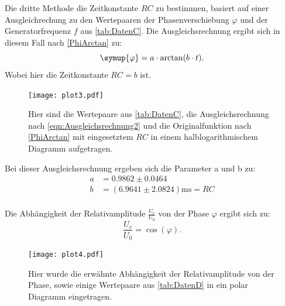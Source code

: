 Die dritte Methode die Zeitkonstante $RC$ zu bestimmen, basiert auf einer Ausgleichrechung zu den Wertepaaren der Phasenverschiebung $\varphi$ 
und der Generatorfrequenz $f$ aus \autoref{tab:DatenC}.
Die Ausgleichsrechnung ergibt sich in diesem Fall nach \eqref{PhiArctan} zu:
\begin{equation}
  \label{eqn:Ausgleichsrechnung2}
  \symup{\varphi} = a\cdot\arctan(b\cdot t).
\end{equation}
Wobei hier die Zeitkonstante $RC = b$ ist.
\begin{figure}
  \centering
  \texttt{[image: plot3.pdf]}
  \caption{Hier sind die Wertepaare aus \autoref{tab:DatenC}, die Ausgleichsrechnung nach \eqref{eqn:Ausgleichsrechnung2} und die Originalfunktion nach \eqref{PhiArctan} mit eingesetztem $RC$ in einem halblogarithmischem Diagramm aufgetragen.}
  \label{fig:plot3}
\end{figure}
Bei dieser Ausgleichsrechnung ergeben sich die Parameter a und b zu:
\begin{align*}
  a &=0.9862\pm 0.0464 \\
  b &=(6.9641\pm 2.0824) \unit{\milli\second} = RC \\
\end{align*}

Die Abhängigkeit der Relativamplitude $\frac{U_c}{U_0}$ von der Phase $\varphi$ ergibt sich zu:
\begin{equation*}
  \frac{U_c}{U_0} = \cos\left(\varphi\right).
\end{equation*}

\begin{figure}
  \centering
  \texttt{[image: plot4.pdf]}
  \caption{Hier wurde die erwähnte Abhängigkeit der Relativamplitude von der Phase, sowie einige Wertepaare aus \autoref{tab:DatenD} in ein polar Diagramm eingetragen.}
  \label{fig:plot4}
\end{figure}

